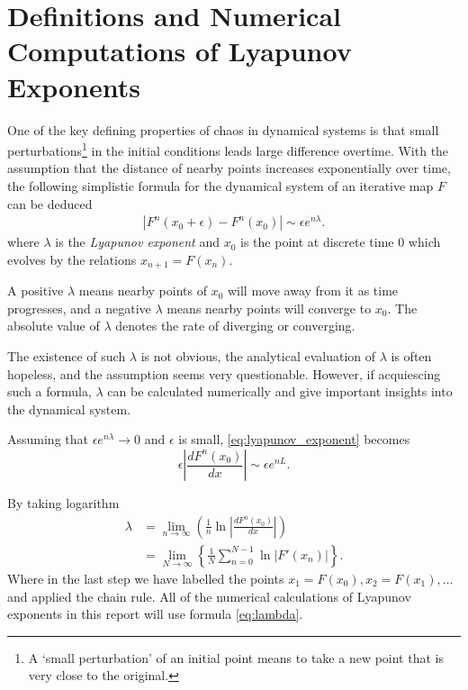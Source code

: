 \section{Definitions and Numerical Computations of Lyapunov Exponents}

One of the key defining properties of chaos in dynamical systems is that small perturbations\footnote{A `small perturbation' of an initial point means to take a new point that is very close to the original.} in the initial conditions leads large difference overtime.
With the assumption that the distance of nearby points increases exponentially over time, the following simplistic formula for the dynamical system of an iterative map $F$ can be deduced
\begin{align}\label{eq:lyapunov_exponent}
    \left|F^n(x_0+\epsilon)-F^n(x_0)\right| \sim \epsilon e^{n \lambda}.
\end{align}
where $\lambda$ is the \emph{Lyapunov exponent} \cite{nonlinear_system} \cite{lyapunov} and $x_0$ is the point at discrete time $0$ which evolves by the relations $x_{n+1} = F(x_n)$.

A positive $\lambda$ means nearby points of $x_0$ will move away from it as time progresses, and a negative $\lambda$ means nearby points will converge to $x_0$. 
The absolute value of $\lambda$ denotes the rate of diverging or converging.

The existence of such $\lambda$ is not obvious, the analytical evaluation of $\lambda$ is often hopeless, and the assumption seems very questionable.
However, if acquiescing such a formula, $\lambda$ can be calculated numerically and give important insights into the dynamical system. 


Assuming that $\epsilon e^{n \lambda} \to 0$ and $\epsilon$ is small, \eqref{eq:lyapunov_exponent} becomes
$$
\epsilon \left| \frac{dF^n(x_0)}{dx} \right| \sim \epsilon e^{nL}.
$$

By taking logarithm
\begin{align}
    \lambda 
    &= \lim_{n \to \infty}\left(\frac{1}{n}\ln{\left|\frac{dF^n(x_0)}{dx}\right|}\right)  \\
    &= \lim_{N \to \infty}\left\{\frac{1}{N}\sum_{n=0}^{N-1}\ln{|F'(x_n)|}\right\}  \label{eq:lambda}.
\end{align}
Where in the last step we have labelled the points $x_1 = F(x_0), x_2 = F(x_1), \dots$ and applied the chain rule.
All of the numerical calculations of Lyapunov exponents in this report will use formula \eqref{eq:lambda}.

